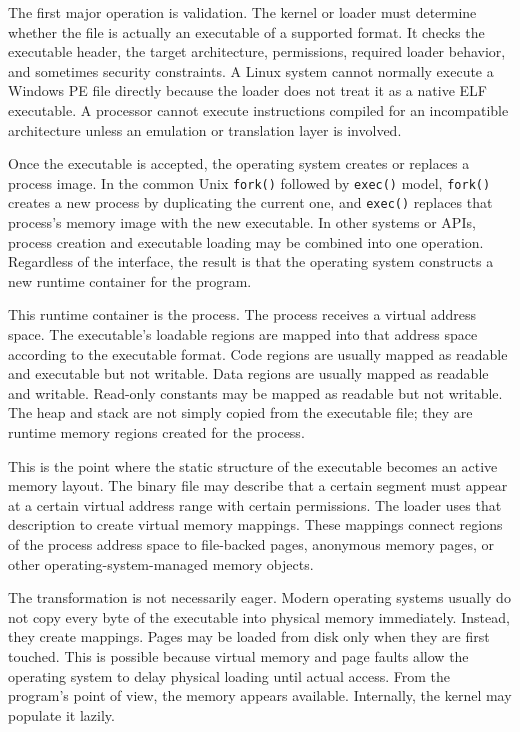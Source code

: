 The first major operation is validation. The kernel or loader must determine whether the file is actually an executable of a supported format. It checks the executable header, the target architecture, permissions, required loader behavior, and sometimes security constraints. A Linux system cannot normally execute a Windows PE file directly because the loader does not treat it as a native ELF executable. A processor cannot execute instructions compiled for an incompatible architecture unless an emulation or translation layer is involved.

Once the executable is accepted, the operating system creates or replaces a process image. In the common Unix \texttt{fork()} followed by \texttt{exec()} model, \texttt{fork()} creates a new process by duplicating the current one, and \texttt{exec()} replaces that process's memory image with the new executable. In other systems or APIs, process creation and executable loading may be combined into one operation. Regardless of the interface, the result is that the operating system constructs a new runtime container for the program.

This runtime container is the process. The process receives a virtual address space. The executable's loadable regions are mapped into that address space according to the executable format. Code regions are usually mapped as readable and executable but not writable. Data regions are usually mapped as readable and writable. Read-only constants may be mapped as readable but not writable. The heap and stack are not simply copied from the executable file; they are runtime memory regions created for the process.

This is the point where the static structure of the executable becomes an active memory layout. The binary file may describe that a certain segment must appear at a certain virtual address range with certain permissions. The loader uses that description to create virtual memory mappings. These mappings connect regions of the process address space to file-backed pages, anonymous memory pages, or other operating-system-managed memory objects.

The transformation is not necessarily eager. Modern operating systems usually do not copy every byte of the executable into physical memory immediately. Instead, they create mappings. Pages may be loaded from disk only when they are first touched. This is possible because virtual memory and page faults allow the operating system to delay physical loading until actual access. From the program's point of view, the memory appears available. Internally, the kernel may populate it lazily.

